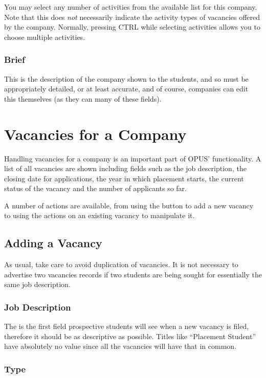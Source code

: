\documentclass[12 pt]{book}
\begin{document}
You may select any number of activities from the available list for this
company. Note that this does \emph{not} necessarily indicate the activity 
types of vacancies offered by the company. Normally, pressing CTRL while
selecting activities allows you to choose multiple activities.

\subsubsection{Brief}

This is the description of the company shown to the students, and so must
be appropriately detailed, or at least accurate, and of course, companies can
edit this themselves (as they can many of these fields).

\section{Vacancies for a Company}

Handling vacancies for a company is an important part of OPUS' functionality.
A list of all vacancies are shown including fields such as the job description,
the closing date for applications, the year in which placement starts, the
current status of the vacancy and the number of applicants so far.

A number of actions are available, from using the  button to
add a new vacancy to using the actions on an existing vacancy to manipulate
it.

\subsection{Adding a Vacancy}

As usual, take care to avoid duplication of vacancies. It is not necessary to
advertise two vacancies records if two students are being sought for 
essentially the same job description.

\subsubsection{Job Description}

The  is the first field prospective students will
see when a new vacancy is filed, therefore it should be as descriptive as
possible. Titles like ``Placement Student'' have absolutely no value since all
the vacancies will have that in common.

\subsubsection{Type}
\end{document}
